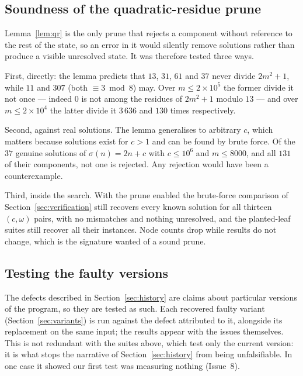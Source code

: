 \documentclass[11pt]{amsart}
\theoremstyle{remark}
\begin{document}
\subsection{Soundness of the quadratic-residue prune}\label{sec:qrtest}
Lemma~\ref{lem:qr} is the only prune that rejects a component without reference
to the rest of the state, so an error in it would silently remove solutions
rather than produce a visible unresolved state. It was therefore tested three
ways.

First, directly: the lemma predicts that $13$, $31$, $61$ and $37$ never divide
$2m^{2}+1$, while $11$ and $307$ (both $\equiv 3 \bmod 8$) may. Over
$m \le 2 \times 10^{5}$ the former divide it not once --- indeed $0$ is not among
the residues of $2m^{2}+1$ modulo $13$ --- and over $m \le 2\times 10^{4}$ the
latter divide it $3\,636$ and $130$ times respectively.

Second, against real solutions. The lemma generalises to arbitrary $c$, which
matters because solutions exist for $c > 1$ and can be found by brute force. Of
the $37$ genuine solutions of $\sigma(n) = 2n + c$ with $c \le 10^{6}$ and
$m \le 8000$, and all $131$ of their components, not one is rejected. Any
rejection would have been a counterexample.

Third, inside the search. With the prune enabled the brute-force comparison of
Section~\ref{sec:verification} still recovers every known solution for all
thirteen $(c, \omega)$ pairs, with no mismatches and nothing unresolved, and the
planted-leaf suites still recover all their instances. Node counts drop while
results do not change, which is the signature wanted of a sound prune.

\subsection{Testing the faulty versions}
The defects described in Section~\ref{sec:history} are claims about particular
versions of the program, so they are tested as such. Each recovered faulty
variant (Section~\ref{sec:variants}) is run against the defect attributed to it,
alongside its replacement on the same input; the results appear with the issues
themselves. This is not redundant with the suites above, which test only the
current version: it is what stops the narrative of Section~\ref{sec:history} from
being unfalsifiable. In one case it showed our first test was measuring nothing
(Issue~8).

\end{document}

